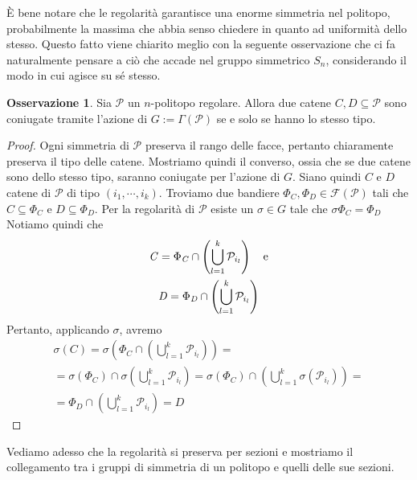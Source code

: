 \documentclass[a4paper,12pt]{report}
\newcommand{\p}{\mathcal{P}}
\theoremstyle{plain}
\theoremstyle{definition}
\newtheorem{oss}[teo]{Osservazione}
\begin{document}
\`E bene notare che le regolarit\`a garantisce una enorme simmetria nel politopo, probabilmente la massima che abbia senso chiedere
in quanto ad uniformit\`a dello stesso. Questo fatto viene chiarito meglio con la seguente osservazione che ci fa naturalmente 
pensare a ci\`o che accade nel gruppo simmetrico $S_n$, considerando il modo in cui agisce su s\'e stesso.

\begin{oss}
\label{oss:ChainTransitivity}
Sia $\p$ un $n$-politopo regolare. Allora due catene $\mathit{C},\mathit{D}\subseteq\p$ sono coniugate tramite l'azione di $G:=\Gamma(\p)$ se
e solo se hanno lo stesso tipo.
\end{oss}
\begin{proof}
Ogni simmetria di $\p$ preserva il rango delle facce, pertanto chiaramente preserva il tipo delle catene. Mostriamo quindi il converso, ossia che se 
due catene sono dello stesso tipo, saranno coniugate per l'azione di $G$. Siano quindi $\mathit{C}$ e $\mathit{D}$ catene di $\p$ di tipo
$(i_1,\cdots,i_k)$. Troviamo due bandiere $\Phi_\mathit{C},\Phi_\mathit{D}\in\mathcal{F}(\p)$ tali che $\mathit{C}\subseteq\Phi_\mathit{C}$ e 
$\mathit{D}\subseteq\Phi_\mathit{D}$. Per la regolarit\`a di $\p$ esiste un $\sigma\in G$ tale che $\sigma\Phi_\mathit{C}=\Phi_\mathit{D}$
Notiamo quindi che
\begin{gather*}
\mathit{C}=\Phi_\mathit{C}\cap\left(\bigcup_{l=1}^k\p_{i_l}\right)\text{\quad e}\\
\mathit{D}=\Phi_\mathit{D}\cap\left(\bigcup_{l=1}^k\p_{i_l}\right)
\end{gather*}
Pertanto, applicando $\sigma$, avremo
\begin{gather*}
\sigma\left(\mathit{C}\right)=\sigma\left(\Phi_\mathit{C}\cap\left(\bigcup_{l=1}^k\p_{i_l}\right)\right)=\\
=\sigma\left(\Phi_\mathit{C}\right)\cap\sigma\left(\bigcup_{l=1}^k\p_{i_l}\right)=
\sigma\left(\Phi_\mathit{C}\right)\cap\left(\bigcup_{l=1}^k\sigma(\p_{i_l})\right)=\\
=\Phi_\mathit{D}\cap\left(\bigcup_{l=1}^k\p_{i_l}\right)=\mathit{D}
\end{gather*}
\end{proof}

Vediamo adesso che la regolarit\`a si preserva per sezioni e mostriamo il collegamento tra i gruppi di simmetria di un politopo e quelli delle sue sezioni.
\end{document}
